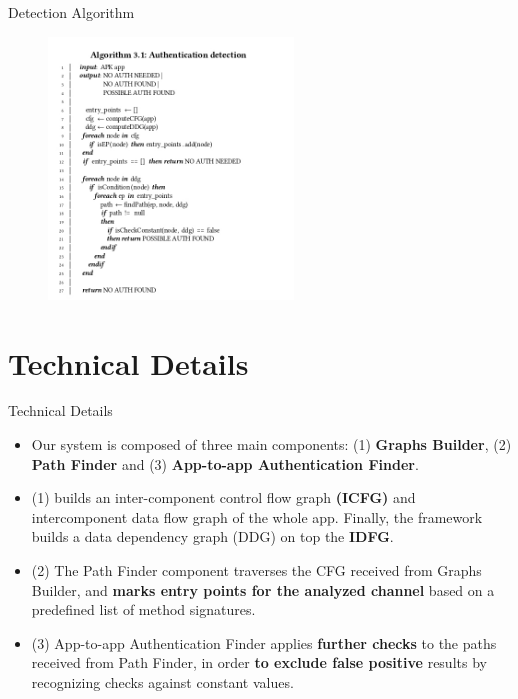 \documentclass[10pt]{beamer}
\begin{document}
\begin{frame}[fragile]{Detection Algorithm}

 \begin{figure}[bhp]
    \centering
	\includegraphics[width=65mm]{img/algo}
     \end{figure}
  
\end{frame}

\section{Technical Details}
\begin{frame}[fragile]{Technical Details} 

\begin{itemize}

\item Our system is composed of three main components: (1) {\bf Graphs
  Builder}, (2) {\bf Path Finder} and (3) {\bf App-to-app Authentication
  Finder}. 

\item (1) builds an inter-component control flow graph {\bf (ICFG)}
  and intercomponent data flow graph of the whole app. Finally, the
  framework builds a data dependency graph (DDG) on top the {\bf
    IDFG}.

\item (2) The Path Finder component traverses the CFG received from
  Graphs Builder, and {\bf marks entry points for the analyzed channel}
  based on a predefined list of method signatures.
 
\item (3) App-to-app Authentication Finder applies {\bf further
    checks} to the paths received from Path Finder, in order {\bf to
    exclude false positive} results by recognizing checks against
  constant values.
 

\end{itemize}
\end{frame}
\end{document}
